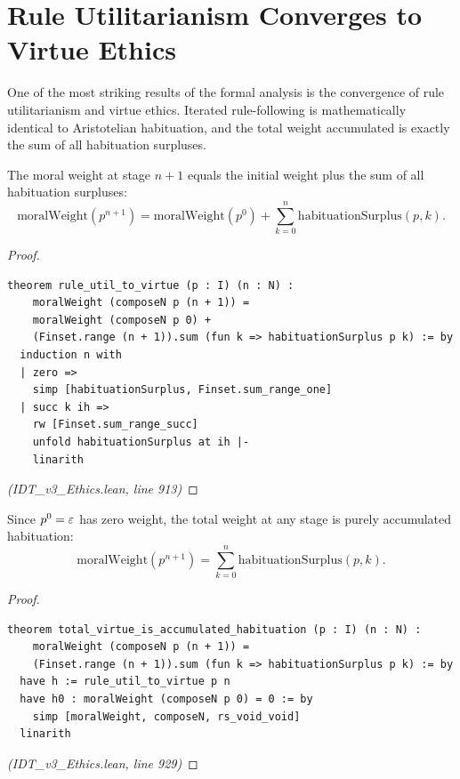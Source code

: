 \section{Rule Utilitarianism Converges to Virtue Ethics}
\label{sec:rule-to-virtue}

One of the most striking results of the formal analysis is the convergence
of rule utilitarianism and virtue ethics. Iterated rule-following is
mathematically identical to Aristotelian habituation, and the total weight
accumulated is exactly the sum of all habituation surpluses.

\begin{theorem}
\label{thm:rule-util-to-virtue}
The moral weight at stage $n+1$ equals the initial weight plus the sum of
all habituation surpluses:
\[
  \mathrm{moralWeight}(p^{n+1}) = \mathrm{moralWeight}(p^0) +
  \sum_{k=0}^{n} \mathrm{habituationSurplus}(p, k).
\]
\end{theorem}

\begin{proof}
\begin{lstlisting}
theorem rule_util_to_virtue (p : I) (n : N) :
    moralWeight (composeN p (n + 1)) =
    moralWeight (composeN p 0) +
    (Finset.range (n + 1)).sum (fun k => habituationSurplus p k) := by
  induction n with
  | zero =>
    simp [habituationSurplus, Finset.sum_range_one]
  | succ k ih =>
    rw [Finset.sum_range_succ]
    unfold habituationSurplus at ih |-
    linarith
\end{lstlisting}
\textit{(IDT\_v3\_Ethics.lean, line 913)}
\end{proof}

\begin{theorem}
\label{thm:total-virtue}
Since $p^0 = \varepsilon$ has zero weight, the total weight at any stage is
purely accumulated habituation:
\[
  \mathrm{moralWeight}(p^{n+1}) = \sum_{k=0}^{n} \mathrm{habituationSurplus}(p, k).
\]
\end{theorem}

\begin{proof}
\begin{lstlisting}
theorem total_virtue_is_accumulated_habituation (p : I) (n : N) :
    moralWeight (composeN p (n + 1)) =
    (Finset.range (n + 1)).sum (fun k => habituationSurplus p k) := by
  have h := rule_util_to_virtue p n
  have h0 : moralWeight (composeN p 0) = 0 := by
    simp [moralWeight, composeN, rs_void_void]
  linarith
\end{lstlisting}
\textit{(IDT\_v3\_Ethics.lean, line 929)}
\end{proof}

